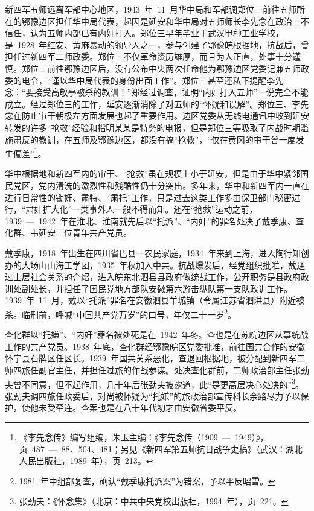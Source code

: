 新四军五师远离军部中心地区，1943~年~11~月华中局和军部调郑位三前往五师所在的鄂豫边区担任华中局代表，起因是延安和华中局对五师师长李先念在政治上不信任，认为五师内部已有内奸打入。郑位三早年毕业于武汉甲种工业学校，是~1928~年红安、黄麻暴动的领导人之一，参与创建了鄂豫皖根据地，抗战后，曾担任过新四军二师政委。郑位三不仅革命资历雄厚，而且为人正直，处事十分谨慎。郑位三前往鄂豫边区后，没有公布中央两次任命他为鄂豫边区党委记兼五师政委的电令，“谨以华中局代表的身份出面工作”。郑位三甚至还私下提醒李先念：“要接受高敬亭被杀的教训！”郑经过调查，证明“内奸打入五师”一说完全不能成立。经过郑位三的工作，延安逐渐消除了对五师的“怀疑和误解”。郑位三、李先念在防止审干朝极左方面发展也起了重要作用。边区党委从无线电通讯中收到延安转发的许多“抢救”经验和指明某某是特务的电报，但是郑位三等吸取了内战时期滥施肃反的教训，在五师及鄂豫边区，都没有搞“抢救”，“仅在黄冈的审干曾一度发生偏差”\footnote{《李先念传》编写组编，朱玉主编：《李先念传（1909~—~1949）》，页~487~—~88、504、481；另见《新四军第五师抗日战争史稿》（武汉：湖北人民出版社，1989~年），页~213。}。

华中根据地和新四军内的审干、“抢救”虽在规模上小于延安，但是由于华中紧邻国民党区，党内清洗的激烈性和残酷性仍十分突出。多年来，华中和新四军内一直在进行日常性的锄奸、肃特、“肃托”工作，只是过去这类工作多由保卫部门秘密进行，“肃奸扩大化”一类事外人一般不得而知。还在“抢救”运动之前，1939~—~1942~年在淮北、淮南就先后以“托派”、“内奸”的罪名处决了戴季康、查化群、韦延安三位青年共产党员。

戴季康，1918~年出生在四川省巴县一农民家庭，1934~年来到上海，进入陶行知创办的大场山山海工学团，1935~年秋加入中共。抗战爆发后，经党组织批准，戴通过上层社会关系的介绍，进入皖东北泗县县政府做统战工作，公开职务是县政府政训处副处长，并担任了国民党地方部队安徽第六游击纵队第一支队政训工作。1939~年~11~月，戴以“托派”罪名在安徽泗县羊城镇（令属江苏省泗洪县）附近被杀。临刑前，呼喊“中国共产党万岁”的口号，年仅二十一岁\footnote{1981~年中组部复查，确认“戴季康托派案”为错案，予以平反昭雪。}。

查化群以“托嫌”、“内奸”罪名被处死是在~1942~年冬。查也是在苏皖边区从事统战工作的共产党员。1938~年底，查化群经鄂豫皖区党委批准，前往国共合作的安徽怀宁县石牌区任区长。1939~年国共关系恶化，查退回根据地，被分配到新四军二师四旅任副官主任，并担任过旅的作战参谋。处决查化群前，二师政治部主任张劲夫曾不同意，但不起作用，几十年后张劲夫披露道，此“是更高层决心处决的”\footnote{张劲夫：《怀念集》（北京：中共中央党校出版社，1994~年），页~221。}。张劲夫调四旅任政委后，对尚被怀疑为“托嫌”的旅政治部宣传科长余路尽力予以保护，使他未受牵连。查案也是在八十年代初才由安徽省委平反。

